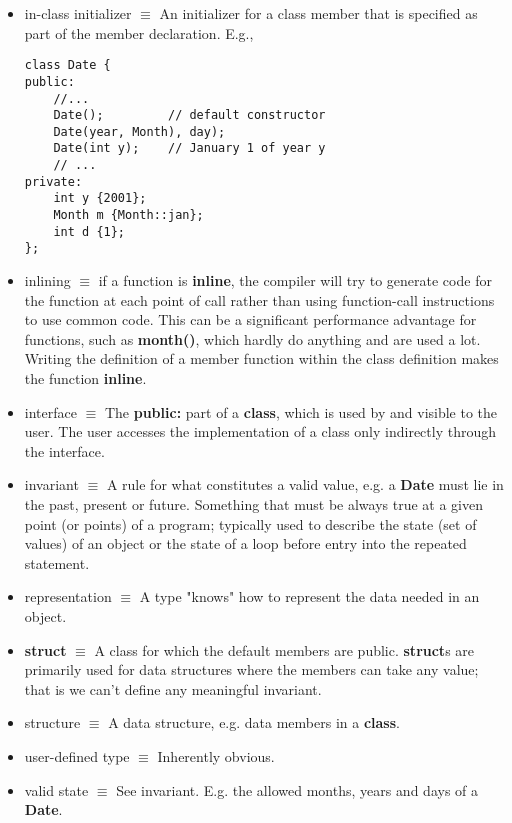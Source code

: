 \documentclass[12pt]{article}
\begin{document}
\begin{itemize}
\item in-class initializer $\equiv$ An initializer for a class member that is specified as part of the member declaration. E.g.,

\begin{lstlisting}
class Date {
public:
	//...
	Date();			// default constructor
	Date(year, Month), day);
	Date(int y);	// January 1 of year y
	// ...
private:
	int y {2001};
	Month m {Month::jan};
	int d {1};
};
\end{lstlisting}

\item inlining $\equiv$ if a function is \textbf{inline}, the compiler will try to generate code for the function at each point of call rather than using function-call instructions to use common code. This can be a significant performance advantage for functions, such as \textbf{month()}, which hardly do anything and are used a lot. Writing the definition of a member function within the class definition makes the function \textbf{inline}.

\item interface $\equiv$ The \textbf{public:} part of a \textbf{class}, which is used by and visible to the user. The user accesses the implementation of a class only indirectly through the interface.

\item invariant $\equiv$ A rule for what constitutes a valid value, e.g. a \textbf{Date} must lie in the past, present or future. Something that must be always true at a given point (or points) of a program; typically used to describe the state (set of values) of an object or the state of a loop before entry into the repeated statement.

\item representation $\equiv$ A type "knows" how to represent the data needed in an object.

\item \textbf{struct} $\equiv$ A class for which the default members are public. \textbf{struct}s are primarily used for data structures where the members can take any value; that is we can't define any meaningful invariant.

\item structure $\equiv$ A data structure, e.g. data members in a \textbf{class}.

\item user-defined type $\equiv$ Inherently obvious.

\item valid state $\equiv$ See invariant. E.g. the allowed months, years and days of a \textbf{Date}.


\end{itemize}
\end{document}
